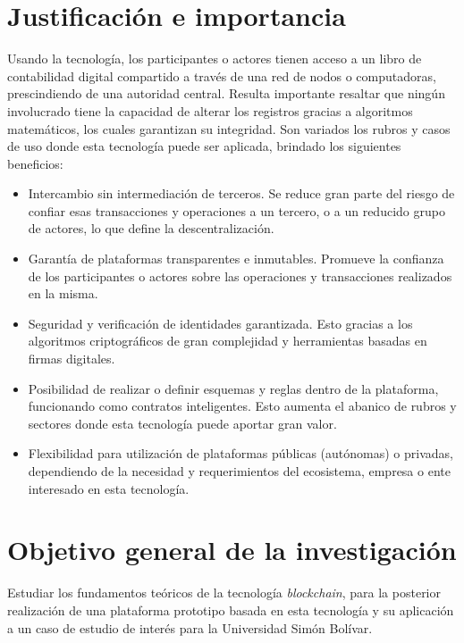 \section{Justificación e importancia}


Usando la tecnología, los participantes o actores tienen acceso a un libro de contabilidad digital compartido a través de una red de nodos o computadoras, prescindiendo de una autoridad central. Resulta importante resaltar que ningún involucrado tiene la capacidad de alterar los registros gracias a algoritmos matemáticos, los cuales garantizan su integridad. Son variados los rubros y casos de uso donde esta tecnología puede ser aplicada, brindado los siguientes beneficios:
\begin{itemize}
\item Intercambio sin intermediación de terceros. Se reduce gran parte del riesgo de confiar esas transacciones y operaciones a un tercero, o a un  reducido grupo de actores, lo que define la descentralización.
\item Garantía de plataformas transparentes e inmutables. Promueve la confianza de los participantes o actores sobre las operaciones y transacciones realizados en la misma.
\item Seguridad y verificación de identidades garantizada. Esto gracias a los  algoritmos criptográficos de gran complejidad y herramientas basadas en  firmas digitales.
\item Posibilidad de realizar o definir esquemas y reglas dentro de la plataforma, funcionando como contratos inteligentes. Esto aumenta el abanico de rubros y sectores donde esta tecnología puede aportar gran valor.
\item Flexibilidad para utilización de plataformas públicas (autónomas) o privadas, dependiendo de la necesidad y requerimientos del ecosistema, empresa o ente interesado en esta tecnología.
\end{itemize}

\section{Objetivo general de la investigación}

Estudiar los fundamentos teóricos de la tecnología \textit{blockchain}, para la posterior realización de una plataforma prototipo basada en esta tecnología y su aplicación a un caso de estudio de interés para la Universidad Simón Bolívar.

